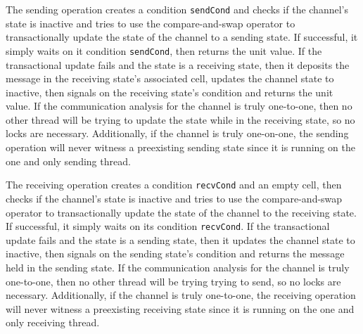 \documentclass[letterpaper, 11pt]{extarticle}
\begin{document}
The sending operation creates a condition \lstinline{sendCond} and checks
if the channel's state is inactive and tries to use the
compare-and-swap operator to transactionally update the state of the channel to a
sending state.
If successful, it simply waits on it condition \lstinline{sendCond}, then returns the unit value.
If the transactional update fails and the state is a receiving state,
then it deposits the message in the receiving state's associated cell,
updates the channel state to inactive, then signals on the receiving state's 
condition and returns the unit value.
If the communication analysis for the channel is
truly one-to-one, then no other thread will be trying to update the state while in
the receiving state, so no locks are necessary.
Additionally, if the channel is truly one-on-one, the sending operation will never
witness a preexisting sending state since it is running on the one and only sending thread. 

The receiving operation creates a condition \lstinline{recvCond} and an empty cell,
then checks if the channel's state is inactive and tries to use the
compare-and-swap operator to transactionally update the state of the channel to
the receiving state.  If successful, it simply waits on its condition \lstinline{recvCond}.
If the transactional update fails and the state is a sending state,
then it updates the channel state to inactive, then signals on the sending state's
condition and returns the message held in the sending state.
If the communication
analysis for the channel is truly one-to-one, then no other thread will be trying
trying to send, so no locks are necessary.
Additionally, if the channel is truly one-to-one, the receiving operation will never
witness a preexisting receiving state since it is running on the one and only receiving thread.
\end{document}
